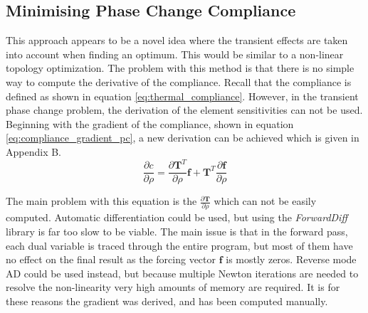 \subsection*{Minimising Phase Change Compliance}
This approach appears to be a novel idea where the transient effects are taken into account when finding an optimum. This would be similar to a non-linear topology optimization. The problem with this method is that there is no simple way to compute the derivative of the compliance. Recall that the compliance is defined as shown in equation \ref{eq:thermal_compliance}. However, in the transient phase change problem, the derivation of the element sensitivities can not be used. Beginning with the gradient of the compliance, shown in equation \ref{eq:compliance_gradient_pc}, a new derivation can be achieved which is given in Appendix B.
\begin{equation}
  \frac{\partial c}{\partial \rho} = \frac{\partial\mathbf{T}^T}{\partial\rho}\mathbf{f}+\mathbf{T}^T\frac{\partial\mathbf{f}}{\partial\rho}
  \label{eq:compliance_gradient_pc}
\end{equation}

The main problem with this equation is the $\frac{\partial\mathbf{T}}{\partial\rho}$ which can not be easily computed. Automatic differentiation could be used, but using the \emph{ForwardDiff} library is far too slow to be viable. The main issue is that in the forward pass, each dual variable is traced through the entire program, but most of them have no effect on the final result as the forcing vector $\mathbf{f}$ is mostly zeros. Reverse mode AD could be used instead, but because multiple Newton iterations are needed to resolve the non-linearity very high amounts of memory are required. It is for these reasons the gradient was derived, and has been computed manually.

